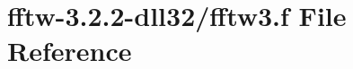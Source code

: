 \hypertarget{fftw-3_82_82-dll32_2fftw3_8f}{\section{fftw-\/3.2.2-\/dll32/fftw3.f File Reference}
\label{fftw-3_82_82-dll32_2fftw3_8f}
}
